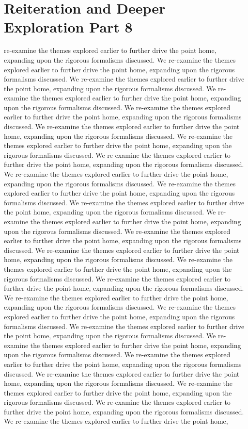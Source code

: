 \section{Reiteration and Deeper Exploration Part 8}\nWe re-examine the themes explored earlier to further drive the point home, expanding upon the rigorous formalisms discussed. We re-examine the themes explored earlier to further drive the point home, expanding upon the rigorous formalisms discussed. We re-examine the themes explored earlier to further drive the point home, expanding upon the rigorous formalisms discussed. We re-examine the themes explored earlier to further drive the point home, expanding upon the rigorous formalisms discussed. We re-examine the themes explored earlier to further drive the point home, expanding upon the rigorous formalisms discussed. We re-examine the themes explored earlier to further drive the point home, expanding upon the rigorous formalisms discussed. We re-examine the themes explored earlier to further drive the point home, expanding upon the rigorous formalisms discussed. We re-examine the themes explored earlier to further drive the point home, expanding upon the rigorous formalisms discussed. We re-examine the themes explored earlier to further drive the point home, expanding upon the rigorous formalisms discussed. We re-examine the themes explored earlier to further drive the point home, expanding upon the rigorous formalisms discussed. We re-examine the themes explored earlier to further drive the point home, expanding upon the rigorous formalisms discussed. We re-examine the themes explored earlier to further drive the point home, expanding upon the rigorous formalisms discussed. We re-examine the themes explored earlier to further drive the point home, expanding upon the rigorous formalisms discussed. We re-examine the themes explored earlier to further drive the point home, expanding upon the rigorous formalisms discussed. We re-examine the themes explored earlier to further drive the point home, expanding upon the rigorous formalisms discussed. We re-examine the themes explored earlier to further drive the point home, expanding upon the rigorous formalisms discussed. We re-examine the themes explored earlier to further drive the point home, expanding upon the rigorous formalisms discussed. We re-examine the themes explored earlier to further drive the point home, expanding upon the rigorous formalisms discussed. We re-examine the themes explored earlier to further drive the point home, expanding upon the rigorous formalisms discussed. We re-examine the themes explored earlier to further drive the point home, expanding upon the rigorous formalisms discussed. We re-examine the themes explored earlier to further drive the point home, expanding upon the rigorous formalisms discussed. We re-examine the themes explored earlier to further drive the point home, expanding upon the rigorous formalisms discussed. We re-examine the themes explored earlier to further drive the point home, expanding upon the rigorous formalisms discussed. We re-examine the themes explored earlier to further drive the point home, expanding upon the rigorous formalisms discussed. We re-examine the themes explored earlier to further drive the point home, 